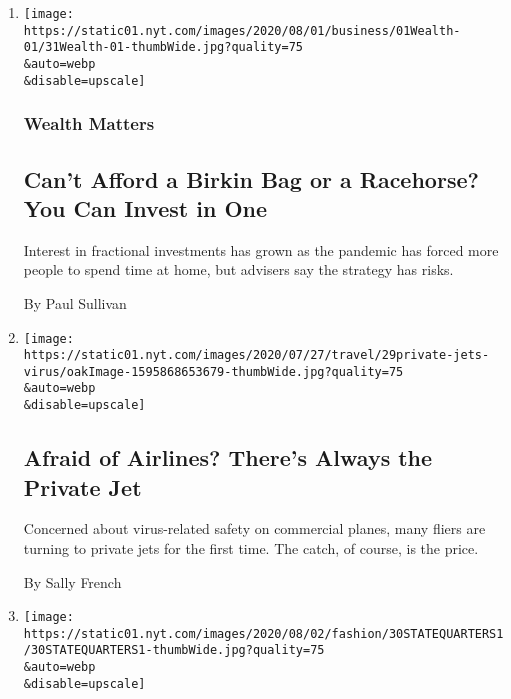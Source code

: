 \begin{enumerate}
\def\labelenumi{\arabic{enumi}.}
\item
  \href{/2020/07/31/your-money/birkin-bag-racehorse-invest.html}{}

  \texttt{[image: https://static01.nyt.com/images/2020/08/01/business/01Wealth-01/31Wealth-01-thumbWide.jpg?quality=75\\\&auto=webp\\\&disable=upscale]}

  \hypertarget{wealth-matters}{%
  \subsubsection{Wealth Matters}\label{wealth-matters}}

  \hypertarget{cant-afford-a-birkin-bag-or-a-racehorse-you-can-invest-in-one}{%
  \subsection{Can't Afford a Birkin Bag or a Racehorse? You Can Invest
  in
  One}\label{cant-afford-a-birkin-bag-or-a-racehorse-you-can-invest-in-one}}

  Interest in fractional investments has grown as the pandemic has
  forced more people to spend time at home, but advisers say the
  strategy has risks.

  By Paul Sullivan
\item
  \href{/2020/07/30/travel/private-jets-coronavirus.html}{}

  \texttt{[image: https://static01.nyt.com/images/2020/07/27/travel/29private-jets-virus/oakImage-1595868653679-thumbWide.jpg?quality=75\\\&auto=webp\\\&disable=upscale]}

  \hypertarget{afraid-of-airlines-theres-always-the-private-jet}{%
  \subsection{Afraid of Airlines? There's Always the Private
  Jet}\label{afraid-of-airlines-theres-always-the-private-jet}}

  Concerned about virus-related safety on commercial planes, many fliers
  are turning to private jets for the first time. The catch, of course,
  is the price.

  By Sally French
\item
  \href{/2020/07/30/style/state-quarters-coin-collectors-shortage-us-mint.html}{}

  \texttt{[image: https://static01.nyt.com/images/2020/08/02/fashion/30STATEQUARTERS1/30STATEQUARTERS1-thumbWide.jpg?quality=75\\\&auto=webp\\\&disable=upscale]}


\end{enumerate}
